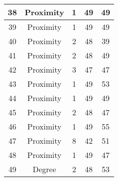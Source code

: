 \documentclass[results.tex]{subfiles}
\begin{document}
\begin{center}
\begin{tabular}{| c || c | c | c | c |}
            \hline
            38                      & Proximity                    & 1                      & 49                      & 49                   \\
            \hline
            39                      & Proximity                    & 1                      & 49                      & 49                   \\
            \hline
            40                      & Proximity                    & 2                      & 48                      & 39                   \\
            \hline
            41                      & Proximity                    & 2                      & 48                      & 49                   \\
            \hline
            42                      & Proximity                    & 3                      & 47                      & 47                   \\
            \hline
            43                      & Proximity                    & 1                      & 49                      & 53                   \\
            \hline
            44                      & Proximity                    & 1                      & 49                      & 49                   \\
            \hline
            45                      & Proximity                    & 2                      & 48                      & 47                   \\
            \hline
            46                      & Proximity                    & 1                      & 49                      & 55                   \\
            \hline
            47                      & Proximity                    & 8                      & 42                      & 51                   \\
            \hline
            48                      & Proximity                    & 1                      & 49                      & 47                   \\
            \hline
            49                      & Degree                       & 2                      & 48                      & 53                   \\
            \hline
        \end{tabular}
    \end{center}
\end{document}
